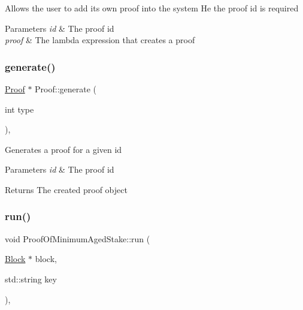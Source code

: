 Allows the user to add its own proof into the system He the proof id is required


\begin{DoxyParams}{Parameters}
{\em id} & The proof id \\
\hline
{\em proof} & The lambda expression that creates a proof \\
\hline
\end{DoxyParams}
\mbox{\label{classProof_a267f0f4587babb59884b5f280e2d54c8}} 
\subsubsection{\texorpdfstring{generate()}{generate()}}
{\footnotesize\ttfamily \mbox{\hyperlink{classProof}{Proof}} $\ast$ Proof\+::generate (\begin{DoxyParamCaption}\item[{int}]{type }\end{DoxyParamCaption})\hspace{0.3cm}{\ttfamily [static]}, {\ttfamily [inherited]}}

Generates a proof for a given id


\begin{DoxyParams}{Parameters}
{\em id} & The proof id \\
\hline
\end{DoxyParams}
\begin{DoxyReturn}{Returns}
The created proof object 
\end{DoxyReturn}
\mbox{\label{classProofOfMinimumAgedStake_aa850369d6f8ebf7fa833821a43049147}} 
\subsubsection{\texorpdfstring{run()}{run()}}
{\footnotesize\ttfamily void Proof\+Of\+Minimum\+Aged\+Stake\+::run (\begin{DoxyParamCaption}\item[{\mbox{\hyperlink{classBlock}{Block}} $\ast$}]{block,  }\item[{std\+::string}]{key }\end{DoxyParamCaption})\hspace{0.3cm}{\ttfamily [override]}, {\ttfamily [virtual]}}

